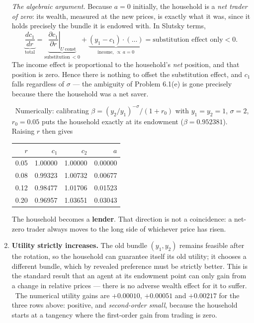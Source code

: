\documentclass[12pt, letterpaper]{article}
\newcommand{\pd}[2]{\dfrac{\partial #1}{\partial #2}}
\newcommand{\dd}[2]{\dfrac{d #1}{d #2}}
\begin{document}
\begin{tcolorbox}[oddbox,title={Problem 6.3 \quad Consumption and Interest Rates}]
\begin{enumerate}
\smallskip
\emph{The algebraic argument.} Because $a=0$ initially, the household is a \emph{net trader
of zero}: its wealth, measured at the new prices, is exactly what it was, since it holds
precisely the bundle it is endowed with. In Slutsky terms,
\[
\underbrace{\dd{c_1}{r}}_{\text{total}}
=\underbrace{\left.\pd{c_1}{r}\right|_{U\ \text{const}}}_{\text{substitution}\ <0}
+\underbrace{\left(y_1-c_1\right)\cdot(\ldots)}_{\text{income, }\propto\,a=0}
=\text{substitution effect only}<0 .
\]
The income effect is proportional to the household's \emph{net} position, and that position
is zero. Hence there is nothing to offset the substitution effect, and $c_1$ falls
regardless of $\sigma$ --- the ambiguity of Problem 6.1(e) is gone precisely because there
the household was a net saver.

\smallskip
\checkmark\ Numerically: calibrating $\beta=(y_2/y_1)^{-\sigma}/(1+r_0)$ with
$y_1=y_2=1$, $\sigma=2$, $r_0=0.05$ puts the household exactly at its endowment
($\beta=0.952381$). Raising $r$ then gives
\begin{center}
\begin{tabular}{@{}rrrr@{}}
\toprule
$r$ & $c_1$ & $c_2$ & $a$ \\
\midrule
0.05 & 1.00000 & 1.00000 & 0.00000 \\
0.08 & 0.99323 & 1.00732 & 0.00677 \\
0.12 & 0.98477 & 1.01706 & 0.01523 \\
0.20 & 0.96957 & 1.03651 & 0.03043 \\
\bottomrule
\end{tabular}
\end{center}
The household becomes a \textbf{lender}. That direction is not a coincidence: a net-zero
trader always moves to the long side of whichever price has risen.

\item \textbf{Utility strictly increases.} The old bundle $(y_1,y_2)$ remains feasible after
the rotation, so the household can guarantee itself its old utility; it chooses a different
bundle, which by revealed preference must be strictly better. This is the standard result
that an agent at its endowment point can only gain from a change in relative prices ---
there is no adverse wealth effect for it to suffer.
\checkmark\ The numerical utility gains are $+0.00010$, $+0.00051$ and $+0.00217$ for the
three rows above: positive, and \emph{second-order small}, because the household starts at a
tangency where the first-order gain from trading is zero.


\end{enumerate}
\end{tcolorbox}
\end{document}
